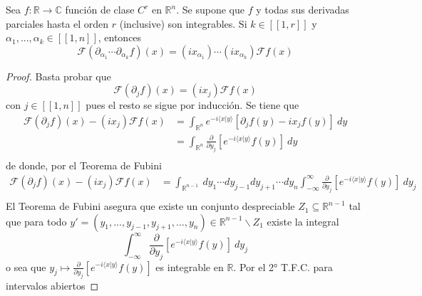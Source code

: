 \documentclass[12pt]{report}
\theoremstyle{largebreak}
\newcommand\cf[3]{\ensuremath{#1:#2\rightarrow#3}}
\newcommand\pint[2]{\ensuremath{\langle#1| #2\rangle}}
\newcommand{\natint}[1]{\ensuremath{\left[\!\left[#1\right]\!\right]}}
\newcommand{\fou}[1]{\ensuremath{\mathcal{F}#1}}
\begin{document}
    \begin{propo}
        Sea $\cf{f}{\mathbb{R}}{\mathbb{C}}$ función de clase $C^r$ en $\mathbb{R}^n$. Se supone que $f$ y todas sus derivadas parciales hasta el orden $r$ (inclusive) son integrables. Si $k\in\natint{1,r}$ y $\alpha_1,...,\alpha_k\in\natint{1,n}$, entonces
        \begin{equation*}
            \fou{(\partial_{\alpha_1}\cdots\partial_{\alpha_k}f)}(x)=(ix_{\alpha_1})\cdots(ix_{\alpha_k})\fou{f}(x)
        \end{equation*}
    \end{propo}

    \begin{proof}
        Basta probar que
        \begin{equation*}
            \fou{(\partial_jf)}(x)=(ix_j)\fou{f}(x)
        \end{equation*}
        con $j\in\natint{1,n}$ pues el resto se sigue por inducción. Se tiene que
        \begin{equation*}
            \begin{split}
                \fou{(\partial_jf)}(x)-(ix_j)\fou{f}(x)&=\int_{\mathbb{R}^n}e^{ -i\pint{x}{y}}[\partial_jf(y)-ix_jf(y)]\:dy\\
                &=\int_{\mathbb{R}^n}\frac{\partial}{\partial y_j} \left[e^{ -i\pint{x}{y}}f(y) \right]\:dy\\
            \end{split}
        \end{equation*}
        de donde, por el Teorema de Fubini
        \begin{equation*}
            \begin{split}
                \fou{(\partial_jf)}(x)-(ix_j)\fou{f}(x)&=\int_{\mathbb{R}^{ n-1}}\:dy_1\cdots dy_{ j-1}dy_{ j+1}\cdots dy_n\int_{-\infty}^\infty\frac{\partial}{\partial y_j}\left[e^{-i\pint{x}{y}}f(y)\right] \:dy_j\\
            \end{split}
        \end{equation*}
        El Teorema de Fubini asegura que existe un conjunto despreciable $Z_1\subseteq\mathbb{R}^{ n-1}$ tal que para todo $y'=(y_1,...,y_{ j-1},y_{ j+1},...,y_n)\in\mathbb{R}^{ n-1}\backslash Z_1$ existe la integral
        \begin{equation*}
            \int_{-\infty}^\infty\frac{\partial}{\partial y_j}\left[e^{-i\pint{x}{y}}f(y)\right] \:dy_j
        \end{equation*}
        o sea que $y_j\mapsto\frac{\partial}{\partial y_j}\left[e^{-i\pint{x}{y}}f(y)\right]$ es integrable en $\mathbb{R}$. Por el 2° T.F.C. para intervalos abiertos

\end{proof}
\end{document}
